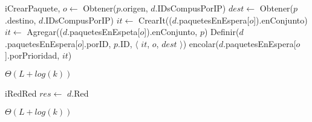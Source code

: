\begin{Algoritmos}
  \begin{algoritmo}{iCrearPaquete}{,}{}
     $o \gets$ Obtener($p$.origen, $d$.IDsCompusPorIP)
     $dest \gets$ Obtener($p$.destino, $d$.IDsCompusPorIP)
    $it \gets$ CrearIt(($d$.paquetesEnEspera[$o$]).enConjunto)
    $it \gets$ Agregar(($d$.paquetesEnEspeta[$o$]).enConjunto, $p$)
    Definir($d$.paquetesEnEspera[$o$].porID, $p$.ID, $\langle$ $it$, $o$, $dest$ $\rangle$)
    encolar($d$.paquetesEnEspera[$o$].porPrioridad, $it$)
  \end{algoritmo}
  \datosAlgoritmo{} %
  {} %
  {} %
  {$\Theta(L+log(k))$} %
  {} %

  \begin{algoritmo}{iRed}{}{Red}
    $res \gets$ $d$.Red 
  \end{algoritmo}
  \datosAlgoritmo{} %
  {} %
  {} %
  {$\Theta(L+log(k))$} %
  {} %


\end{Algoritmos}
